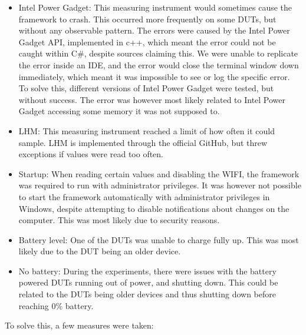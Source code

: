 \begin{itemize}
    \item Intel Power Gadget: This measuring instrument would sometimes cause the framework to crash. This occurred more frequently on some DUTs, but without any observable pattern. The errors were caused by the Intel Power Gadget API, implemented in c++, which meant the error could not be caught within C\#, despite sources claiming this\cite[]{cpp_exceptions}. We were unable to replicate the error inside an IDE, and the error would close the terminal window down immediately, which meant it was impossible to see or log the specific error. To solve this, different versions of Intel Power Gadget were tested, but without success. The error was however most likely related to Intel Power Gadget accessing some memory it was not supposed to.
    \item LHM: This measuring instrument reached a limit of how often it could sample. LHM is implemented through the official GitHub, but threw exceptions if values were read too often.
    \item Startup: When reading certain values and disabling the WIFI, the framework was required to run with administrator privileges. It was however not possible to start the framework automatically with administrator privileges in Windows, despite attempting to disable notifications about changes on the computer. This was most likely due to security reasons.
    \item Battery level: One of the DUTs was unable to charge fully up. This was most likely due to the DUT being an older device.
    \item No battery: During the experiments, there were issues with the battery powered DUTs running out of power, and shutting down. This could be related to the DUTs being older devices and thus shutting down before reaching 0\% battery.
\end{itemize}

To solve this, a few measures were taken:

